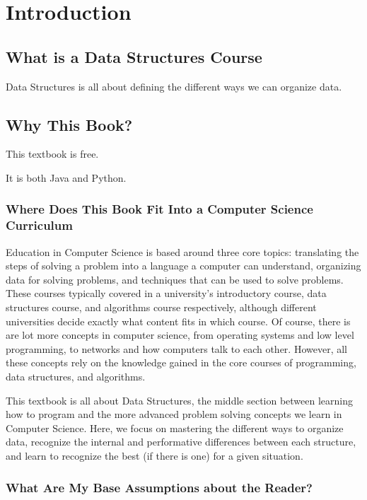 
\chapter{Introduction}

\section{What is a Data Structures Course}
Data Structures is all about defining the different ways we can organize data.


\section{Why This Book?}

This textbook is free.

It is both Java and Python.


\subsection{Where Does This Book Fit Into a Computer Science Curriculum }

Education in Computer Science is based around three core topics: translating the steps of solving a problem into a language a computer can understand, organizing data for solving problems, and techniques that can be used to solve problems. %
These courses typically covered in a university's introductory course, data structures course, and algorithms course respectively, although different universities decide exactly what content fits in which course.
Of course, there is are lot more concepts in computer science, from operating systems and low level programming,  to networks and how computers talk to each other. However, all these concepts rely on the knowledge gained in the core courses of programming, data structures, and algorithms.



This textbook is all about Data Structures, the middle section between learning how to program and the more advanced problem solving concepts we learn in Computer Science. 
Here, we focus on mastering the different ways to organize data, recognize the internal and performative differences between each structure, and learn to recognize the best (if there is one) for a given situation.


\subsection{What Are My Base Assumptions about the Reader?}

